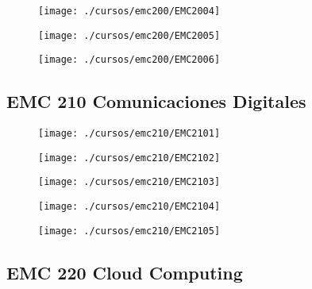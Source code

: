 \begin{figure}[!ht]
    \centering
    \texttt{[image: ./cursos/emc200/EMC2004]}
\end{figure}
\clearpage

\begin{figure}[!ht]
    \centering
    \texttt{[image: ./cursos/emc200/EMC2005]}
\end{figure}
\clearpage

\begin{figure}[!ht]
    \centering
    \texttt{[image: ./cursos/emc200/EMC2006]}
\end{figure}
\clearpage


\subsection{EMC 210 Comunicaciones Digitales} 




\begin{figure}[!ht]
    \centering
    \texttt{[image: ./cursos/emc210/EMC2101]}
\end{figure}
\clearpage

\begin{figure}[!ht]
    \centering
    \texttt{[image: ./cursos/emc210/EMC2102]}
\end{figure}
\clearpage

\begin{figure}[!ht]
    \centering
    \texttt{[image: ./cursos/emc210/EMC2103]}
\end{figure}
\clearpage

\begin{figure}[!ht]
    \centering
    \texttt{[image: ./cursos/emc210/EMC2104]}
\end{figure}
\clearpage

\begin{figure}[!ht]
    \centering
    \texttt{[image: ./cursos/emc210/EMC2105]}
\end{figure}
\clearpage



\subsection{EMC 220 Cloud Computing} 





